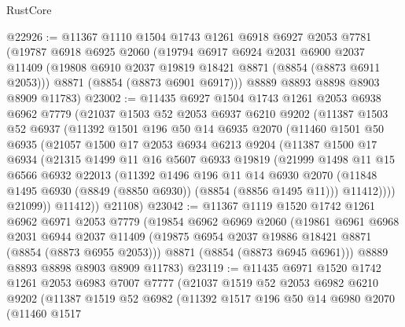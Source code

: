\begin{lexlean}{RustCore}
\begin{coremodule}
@22926 := @11367
    @1110
    @1504
    @1743
    @1261
    @6918
    @6927
    @2053
    @7781
    (@19787
      @6918
      @6925
      @2060
      (@19794
        @6917
        @6924
        @2031
        @6900
        @2037
        @11409
        (@19808 @6910 @2037 @19819 @18421 @8871 (@8854 (@8873 @6911 @2053)))
        @8871
        (@8854 (@8873 @6901 @6917)))
      @8889
      @8893
      @8898
      @8903
      @8909
      @11783)
@23002 := @11435
    @6927
    @1504
    @1743
    @1261
    @2053
    @6938
    @6962
    @7779
    (@21037
      @1503
      @52
      @2053
      @6937
      @6210
      @9202
      (@11387
        @1503
        @52
        @6937
        (@11392
          @1501
          @196
          @50
          @14
          @6935
          @2070
          (@11460
            @1501
            @50
            @6935
            (@21057
              @1500
              @17
              @2053
              @6934
              @6213
              @9204
              (@11387
                @1500
                @17
                @6934
                (@21315
                  @1499
                  @11
                  @16
                  @5607
                  @6933
                  @19819
                  (@21999
                    @1498
                    @11
                    @15
                    @6566
                    @6932
                    @22013
                    (@11392
                      @1496
                      @196
                      @11
                      @14
                      @6930
                      @2070
                      (@11848 @1495 @6930 (@8849 (@8850 @6930)) (@8854 (@8856 @1495 @11)))
                      @11412))))
              @21099))
          @11412))
      @21108)
@23042 := @11367
    @1119
    @1520
    @1742
    @1261
    @6962
    @6971
    @2053
    @7779
    (@19854
      @6962
      @6969
      @2060
      (@19861
        @6961
        @6968
        @2031
        @6944
        @2037
        @11409
        (@19875 @6954 @2037 @19886 @18421 @8871 (@8854 (@8873 @6955 @2053)))
        @8871
        (@8854 (@8873 @6945 @6961)))
      @8889
      @8893
      @8898
      @8903
      @8909
      @11783)
@23119 := @11435
    @6971
    @1520
    @1742
    @1261
    @2053
    @6983
    @7007
    @7777
    (@21037
      @1519
      @52
      @2053
      @6982
      @6210
      @9202
      (@11387
        @1519
        @52
        @6982
        (@11392
          @1517
          @196
          @50
          @14
          @6980
          @2070
          (@11460
            @1517

\end{coremodule}
\end{lexlean}
